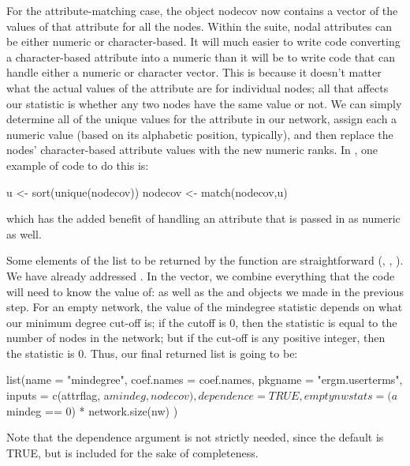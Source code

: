 \documentclass[nojss]{jss}
\begin{document}
For the attribute-matching case, the object nodecov now contains a vector of the
values of that attribute for all the nodes. Within the  suite,
nodal attributes can be either numeric or character-based. It will much easier
to write  code converting a character-based attribute into a numeric
than it will be to write  code that can handle either a numeric or
character vector. This is because it doesn't matter what the actual values of
the attribute are for individual nodes; all that affects our statistic is
whether any two nodes have the same value or not. We can simply determine all of
the unique values for the attribute in our network, assign each a numeric value
(based on its alphabetic position, typically), and then replace the nodes'
character-based attribute values with the new numeric ranks. In ,
one example of code to do this is:
\begin{CodeChunk}
\begin{CodeInput}
  u <- sort(unique(nodecov))
  nodecov <- match(nodecov,u)
\end{CodeInput}
\end{CodeChunk}
which has the added benefit of handling an attribute that is passed in as
numeric as well.

Some elements of the list to be returned by the function are straightforward
(, , ). We have already addressed
. In the  vector, we combine everything that the
 code will need to know the value of:  as well as the
 and  objects we made in the previous step. For an
empty network, the value of the mindegree statistic depends on what our minimum
degree cut-off is; if the cutoff is 0, then the statistic is equal to the number
of nodes in the network; but if the cut-off is any positive integer, then the
statistic is 0. Thus, our final returned list is going to be:
\begin{CodeChunk}
\begin{CodeInput}
  list(name = "mindegree",
    coef.names = coef.names,
    pkgname = "ergm.userterms",
    inputs = c(attrflag, a$mindeg, nodecov),
    dependence = TRUE,
    emptynwstats = (a$mindeg == 0) * network.size(nw)
  )
\end{CodeInput}
\end{CodeChunk}

Note that the dependence argument is not strictly needed, since the default is
TRUE, but is included for the sake of completeness.
\end{document}
